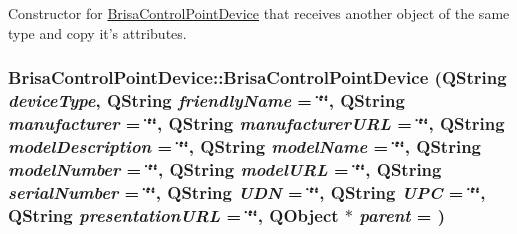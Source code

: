 Constructor for \hyperlink{classBrisaUpnp_1_1BrisaControlPointDevice}{BrisaControlPointDevice} that receives another object of the same type and copy it's attributes. \hypertarget{classBrisaUpnp_1_1BrisaControlPointDevice_ab1c22c8bcf8d041afb766d2773552cdd}{
\subsubsection[{BrisaControlPointDevice}]{\setlength{\rightskip}{0pt plus 5cm}BrisaControlPointDevice::BrisaControlPointDevice (QString {\em deviceType}, \/  QString {\em friendlyName} = {\ttfamily \char`\"{}\char`\"{}}, \/  QString {\em manufacturer} = {\ttfamily \char`\"{}\char`\"{}}, \/  QString {\em manufacturerURL} = {\ttfamily \char`\"{}\char`\"{}}, \/  QString {\em modelDescription} = {\ttfamily \char`\"{}\char`\"{}}, \/  QString {\em modelName} = {\ttfamily \char`\"{}\char`\"{}}, \/  QString {\em modelNumber} = {\ttfamily \char`\"{}\char`\"{}}, \/  QString {\em modelURL} = {\ttfamily \char`\"{}\char`\"{}}, \/  QString {\em serialNumber} = {\ttfamily \char`\"{}\char`\"{}}, \/  QString {\em UDN} = {\ttfamily \char`\"{}\char`\"{}}, \/  QString {\em UPC} = {\ttfamily \char`\"{}\char`\"{}}, \/  QString {\em presentationURL} = {\ttfamily \char`\"{}\char`\"{}}, \/  QObject $\ast$ {\em parent} = {})}}
\label{classBrisaUpnp_1_1BrisaControlPointDevice_ab1c22c8bcf8d041afb766d2773552cdd}


